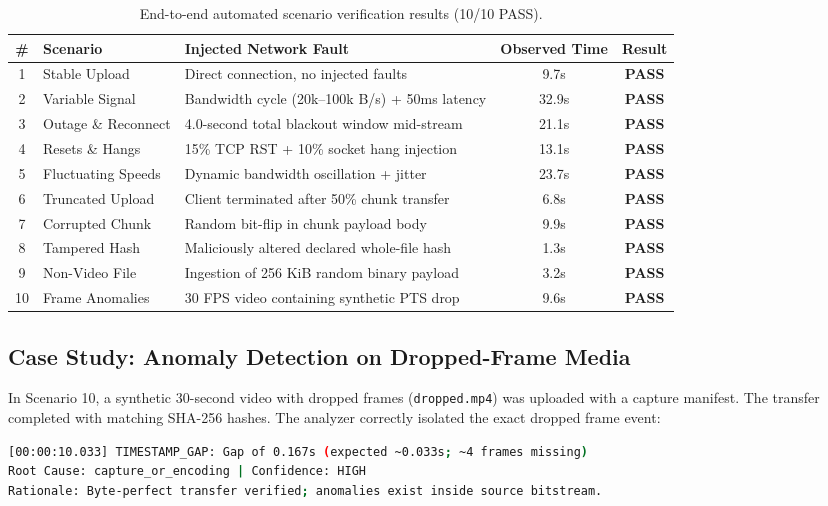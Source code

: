 \documentclass[11pt,a4paper]{article}
\begin{document}
\begin{table}[htbp]
\centering
\small
\begin{tabularx}{\textwidth}{clXcc}
\toprule
\textbf{\#} & \textbf{Scenario} & \textbf{Injected Network Fault} & \textbf{Observed Time} & \textbf{Result} \\
\midrule
1 & Stable Upload & Direct connection, no injected faults & 9.7s & \textbf{PASS} \\
2 & Variable Signal & Bandwidth cycle (20k--100k B/s) + 50ms latency & 32.9s & \textbf{PASS} \\
3 & Outage \& Reconnect & 4.0-second total blackout window mid-stream & 21.1s & \textbf{PASS} \\
4 & Resets \& Hangs & 15\% TCP RST + 10\% socket hang injection & 13.1s & \textbf{PASS} \\
5 & Fluctuating Speeds & Dynamic bandwidth oscillation + jitter & 23.7s & \textbf{PASS} \\
6 & Truncated Upload & Client terminated after 50\% chunk transfer & 6.8s & \textbf{PASS} \\
7 & Corrupted Chunk & Random bit-flip in chunk payload body & 9.9s & \textbf{PASS} \\
8 & Tampered Hash & Maliciously altered declared whole-file hash & 1.3s & \textbf{PASS} \\
9 & Non-Video File & Ingestion of 256 KiB random binary payload & 3.2s & \textbf{PASS} \\
10 & Frame Anomalies & 30 FPS video containing synthetic PTS drop & 9.6s & \textbf{PASS} \\
\bottomrule
\end{tabularx}
\caption{End-to-end automated scenario verification results (10/10 PASS).}
\label{tab:scenarios}
\end{table}

\subsection{Case Study: Anomaly Detection on Dropped-Frame Media}
In Scenario 10, a synthetic 30-second video with dropped frames (\texttt{dropped.mp4}) was uploaded with a capture manifest. The transfer completed with matching SHA-256 hashes. The analyzer correctly isolated the exact dropped frame event:
\begin{lstlisting}[language=bash]
[00:00:10.033] TIMESTAMP_GAP: Gap of 0.167s (expected ~0.033s; ~4 frames missing)
Root Cause: capture_or_encoding | Confidence: HIGH
Rationale: Byte-perfect transfer verified; anomalies exist inside source bitstream.
\end{lstlisting}
\end{document}
